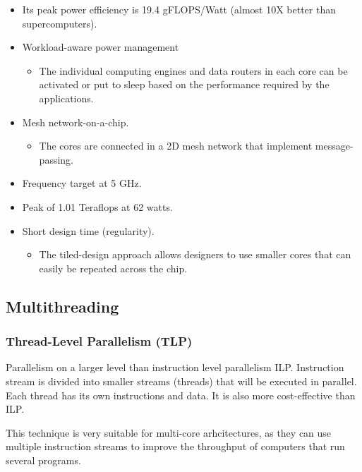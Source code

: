 \begin{itemize}
\item Its peak power efficiency is 19.4 gFLOPS/Watt (almost 10X better than supercomputers).
\item Workload-aware power management
  \begin{itemize}
  \item The individual computing engines and data routers in each core can be activated or put to sleep based on the performance required by the applications.
  \end{itemize}
\item Mesh network-on-a-chip.
  \begin{itemize}
  \item The cores are connected in a 2D mesh network that implement message-passing. 
  \end{itemize}
\item Frequency target at 5 GHz.
\item Peak of 1.01 Teraflops at 62 watts.
\item Short design time (regularity).
  \begin{itemize}
  \item The tiled-design approach allows designers to use smaller cores that can easily be repeated across the chip. 
  \end{itemize}
\end{itemize}


\subsection{Multithreading}

\subsubsection{Thread-Level Parallelism (TLP)}
Parallelism on a larger level than instruction level parallelism ILP. Instruction stream is divided into smaller streams (threads) that will be executed in parallel. Each thread has its own instructions and data. It is also more cost-effective than ILP.

This technique is very suitable for multi-core arhcitectures, as they can use multiple instruction streams to improve the throughput of computers that run several programs.

